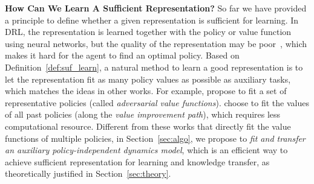\textbf{How Can We Learn A Sufficient Representation?}
So far we have provided a principle to define whether a given representation is sufficient for learning. In DRL, the representation is learned together with the policy or value function using neural networks, but the quality of the representation may be poor~\citep{dabney2020the}, which makes it hard for the agent to find an optimal policy.
Based on Definition~\ref{def:suf_learn}, a natural method to learn a good representation is to let the representation fit as many policy values as possible as auxiliary tasks, which matches the ideas in other works. For example, \citet{bellemare2019geometric} propose to fit a set of representative policies (called \textit{adversarial value functions}). 
\citet{dabney2020the} choose to fit the values of all past policies (along the \textit{value improvement path}), which requires less computational resource.
Different from these works that directly fit the value functions of multiple policies, in Section~\ref{sec:algo}, we propose to \emph{fit and transfer an auxiliary policy-independent dynamics model}, which is an efficient way to achieve sufficient representation for learning and knowledge transfer, as theoretically justified in Section~\ref{sec:theory}.

